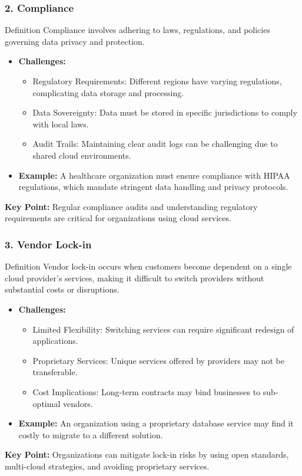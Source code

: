 \documentclass[aspectratio=169]{beamer}
\begin{document}
\begin{frame}[fragile]
    \frametitle{2. Compliance}
    \begin{block}{Definition}
        Compliance involves adhering to laws, regulations, and policies governing data privacy and protection.
    \end{block}
    \begin{itemize}
        \item \textbf{Challenges:}
        \begin{itemize}
            \item Regulatory Requirements: Different regions have varying regulations, complicating data storage and processing.
            \item Data Sovereignty: Data must be stored in specific jurisdictions to comply with local laws.
            \item Audit Trails: Maintaining clear audit logs can be challenging due to shared cloud environments.
        \end{itemize}
        \item \textbf{Example:} A healthcare organization must ensure compliance with HIPAA regulations, which mandate stringent data handling and privacy protocols.
    \end{itemize}
    \textbf{Key Point:} Regular compliance audits and understanding regulatory requirements are critical for organizations using cloud services.
\end{frame}

\begin{frame}[fragile]
    \frametitle{3. Vendor Lock-in}
    \begin{block}{Definition}
        Vendor lock-in occurs when customers become dependent on a single cloud provider's services, making it difficult to switch providers without substantial costs or disruptions.
    \end{block}
    \begin{itemize}
        \item \textbf{Challenges:}
        \begin{itemize}
            \item Limited Flexibility: Switching services can require significant redesign of applications.
            \item Proprietary Services: Unique services offered by providers may not be transferable.
            \item Cost Implications: Long-term contracts may bind businesses to sub-optimal vendors.
        \end{itemize}
        \item \textbf{Example:} An organization using a proprietary database service may find it costly to migrate to a different solution.
    \end{itemize}
    \textbf{Key Point:} Organizations can mitigate lock-in risks by using open standards, multi-cloud strategies, and avoiding proprietary services.
\end{frame}
\end{document}

